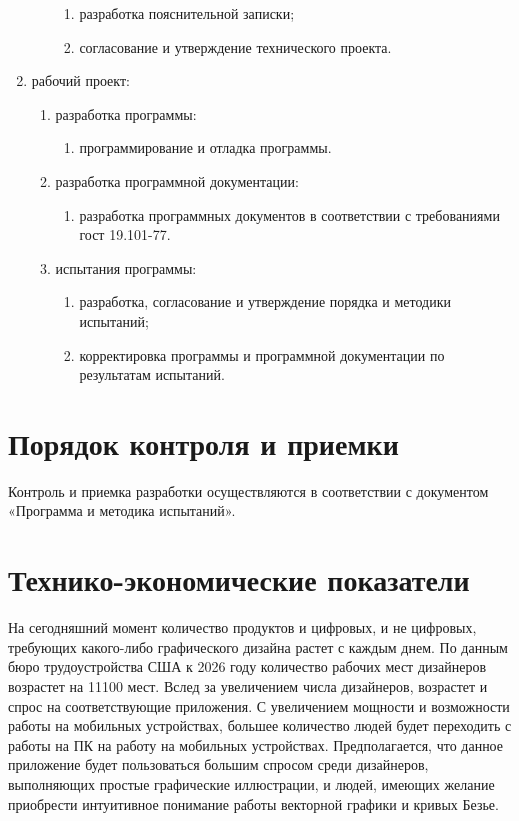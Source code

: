\documentclass{../TechDoc}
\begin{document}
\begin{enumerate}
\begin{enumerate}
        \begin{enumerate}
            \item разработка пояснительной записки; 
            \item согласование и утверждение технического проекта. 
        \end{enumerate}
    \end{enumerate}
    \item рабочий проект:
    \begin{enumerate}
        \item разработка программы:
        \begin{enumerate}
            \item программирование и отладка программы. 
        \end{enumerate}
        \item разработка программной документации:
        \begin{enumerate}
            \item разработка программных документов в соответствии с требованиями гост 19.101-77. 
        \end{enumerate}
        \item испытания программы:
        \begin{enumerate}
            \item разработка, согласование и утверждение порядка и методики испытаний; 
            \item корректировка программы и программной документации по результатам испытаний.
        \end{enumerate}
    \end{enumerate}
    \end{enumerate}

    \section{Порядок контроля и приемки}
    
    Контроль и приемка разработки осуществляются в соответствии с документом «Программа и методика испытаний».
    
    \section{Технико-экономические показатели}
    
     На сегодняшний момент количество продуктов и цифровых, и не цифровых, требующих какого-либо графического дизайна растет с каждым днем. По данным бюро трудоустройства США к 2026 году количество рабочих мест дизайнеров возрастет на 11100 мест. Вслед за увеличением числа дизайнеров, возрастет и спрос на соответствующие приложения. С увеличением мощности и возможности работы на мобильных устройствах, большее количество людей будет переходить с работы на ПК на работу на мобильных устройствах. Предполагается, что данное приложение будет пользоваться большим спросом среди дизайнеров, выполняющих простые графические иллюстрации, и людей, имеющих желание приобрести интуитивное понимание работы векторной графики и кривых Безье.
        
    \registrationList
        
\end{document}
